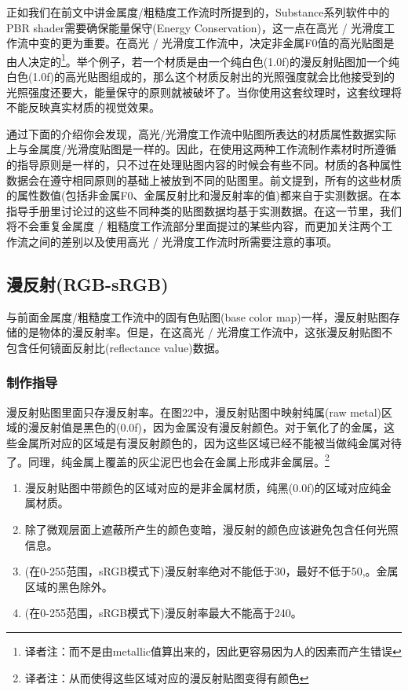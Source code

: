 正如我们在前文中讲金属度/粗糙度工作流时所提到的，Substance系列软件中的PBR shader需要确保能量保守(Energy Conservation)，这一点在高光 / 光滑度工作流中变的更为重要。在高光 / 光滑度工作流中，决定非金属F0值的高光贴图是由人决定的\footnote{译者注：而不是由metallic值算出来的，因此更容易因为人的因素而产生错误}。举个例子，若一个材质是由一个纯白色(1.0f)的漫反射贴图加一个纯白色(1.0f)的高光贴图组成的，那么这个材质反射出的光照强度就会比他接受到的光照强度还要大，能量保守的原则就被破坏了。当你使用这套纹理时，这套纹理将不能反映真实材质的视觉效果。

通过下面的介绍你会发现，高光/光滑度工作流中贴图所表达的材质属性数据实际上与金属度/光滑度贴图是一样的。因此，在使用这两种工作流制作素材时所遵循的指导原则是一样的，只不过在处理贴图内容的时候会有些不同。材质的各种属性数据会在遵守相同原则的基础上被放到不同的贴图里。前文提到，所有的这些材质的属性数值(包括非金属F0、金属反射比和漫反射率的值)都来自于实测数据。在本指导手册里讨论过的这些不同种类的贴图数据均基于实测数据。在这一节里，我们将不会重复金属度 / 粗糙度工作流部分里面提过的某些内容，而更加关注两个工作流之间的差别以及使用高光 / 光滑度工作流时所需要注意的事项。

\subsection{漫反射(RGB-sRGB)}

与前面金属度/粗糙度工作流中的固有色贴图(base color map)一样，漫反射贴图存储的是物体的漫反射率。但是，在这高光 / 光滑度工作流中，这张漫反射贴图不包含任何镜面反射比(reflectance value)数据。

\subsubsection{制作指导}

漫反射贴图里面只存漫反射率。在图22中，漫反射贴图中映射纯属(raw metal)区域的漫反射值是黑色的(0.0f)，因为金属没有漫反射颜色。对于氧化了的金属，这些金属所对应的区域是有漫反射颜色的，因为这些区域已经不能被当做纯金属对待了。同理，纯金属上覆盖的灰尘泥巴也会在金属上形成非金属层。\footnote{译者注：从而使得这些区域对应的漫反射贴图变得有颜色}

\begin{enumerate}
\item 漫反射贴图中带颜色的区域对应的是非金属材质，纯黑(0.0f)的区域对应纯金属材质。
\item 除了微观层面上遮蔽所产生的颜色变暗，漫反射的颜色应该避免包含任何光照信息。
\item (在0-255范围，sRGB模式下)漫反射率绝对不能低于30，最好不低于50,。金属区域的黑色除外。
\item (在0-255范围，sRGB模式下)漫反射率最大不能高于240。
\end{enumerate}

